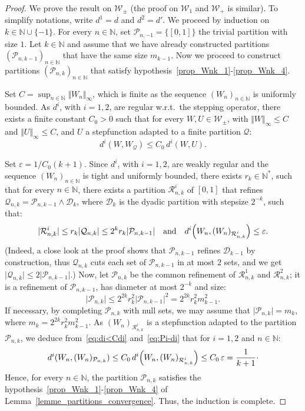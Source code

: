 \documentclass{amsart}
\newcommand{\wrt}{w.r.t.\ }
\theoremstyle{plain}
\theoremstyle{definition}
\newcommand{\signed}{\pm}
\newcommand{\cp}{\mathcal{P}}
\newcommand{\cD}{\mathcal{D}}
\newcommand{\cP}{\mathcal{P}}
\newcommand{\cQ}{\mathcal{Q}}
\newcommand{\cR}{\mathcal{R}}
\newcommand{\Graphon}{\mathcal{W}_1}
\newcommand{\Kernel}{\mathcal{W}_{\signed}}
\newcommand{\Kernelp}{\mathcal{W}_{+}}
\newcommand{\TM}[1]{\norm{#1}_\infty}
\newcommand{\N}{\mathbb{N}}
\newcommand{\norm}[1]{\Vert#1\Vert}
\newcommand{\eps}{\varepsilon}
\begin{document}
\begin{proof}
We prove the result on $\Kernel$ 
(the proof on $\Graphon$ and $\Kernelp$ is similar).
To simplify notations, write $d^1=d$ and $d^2=d'$.
We  proceed  by  induction  on $k\in    \N \cup\{-1\}$.     
For every $n\in\N$, set $\cP_{n,-1} = \{ [0,1] \}$ the trivial partition with size $1$.
  Let  $k\in\N$  and assume 
  that we have already constructed partitions $(\mathcal{P}_{n,k-1} )_{n\in\N}$
  	that have the same size $m_{k-1}$.  
  Now we proceed to  construct partitions $(\mathcal{P}_{n,k})_{n\in\N}$
  that satisfy hypothesis~\ref{prop_Wnk_1}-\ref{prop_Wnk_4}.

Set $C=\sup_{n\in \N} \TM{W_n}$, which is finite as the sequence 
$(W_n)_{n\in \N}$ is uniformly bounded. 
As $d^i$, with $i=1,2$, are  regular       \wrt      the       stepping operator,
there exists a finite constant $C_0>0$ such that for every $W, U\in \Kernel$, 
with $\TM{W}\leq C$ and $\TM{U}\leq C$, and $U$ a stepfunction
adapted to a finite partition  $\mathcal{Q}$:
\begin{equation}
   \label{eq:di<Cdi}
  d^i(W,W_{\mathcal{Q}}) \leq C_0 \, d^i(W,U).
\end{equation}


Set  $\varepsilon=  1/C_0(k+1)$.   Since  $d^i$,  with
$i=1,2$, are  weakly regular and  the sequence $(  W_n )_{n\in\N}$ is  tight and
uniformly  bounded,  there  exists   $r_k\in\N^*$,  such  that  for  every
$n\in \N$,  there exists a
partition  $\cR_{n,k}^i$ of  $[0,1]$  that  refines $\cQ_{n,k} = \cp_{n,k-1} \land \cD_{k}$,
	where $\cD_k$ is the dyadic partition with stepsize $2^{-k}$, 
such that:
\begin{equation}
   \label{eq:Pi-di}
  \vert\cR_{n,k}^i\vert    \leq    r_k   \vert\cQ_{n,k}\vert
  			\leq    2^{k} r_k   \vert\cP_{n,k-1}\vert
  \quad\text{and}\quad
  d^i\Bigl(W_n,   (W_n)_{\cR^i_{n,k}}\Bigr)    \leq    \eps.
\end{equation}
(Indeed, a close look at the proof shows that
	$\cP_{n,k-1}$ refines $\cD_{k-1}$ by construction,
	thus $\cQ_{n,k}$ cuts each set of $\cP_{n,k-1}$ in at most $2$ sets,
	and we get $\vert\cQ_{n,k}\vert \leq 2  \vert\cP_{n,k-1}\vert$.)
Now, let $\mathcal{P}_{n,k}$ be the common refinement of
$\cR_{n,k}^1$  and
$\cR_{n,k}^2$; it is  a refinement of $\mathcal{P}_{n,k-1}$,
has diameter at most $2^{-k}$ and size:
\[
  \vert \mathcal{P}_{n,k} \vert \leq 2^{2k} r_k^2 \vert \cp_{n,k-1} \vert^2
  = 2^{2k} r_k^2 m_{k-1}^2.
\]
If necessary, by completing $\mathcal{P}_{n,k}$ with null sets, we
may assume that $\vert \cP_{n,k} \vert 
	= m_k$, where $m_k = 2^{2k} r_k^2 m_{k-1}^2$.
As $ (W_n)_{\cR^i_{n,k}}$ is a stepfunction 
adapted to the partition $\cp_{n,k}$, we deduce from~\eqref{eq:di<Cdi}
and~\eqref{eq:Pi-di}
that for $i=1,2$ and $n\in \N$:
\[
  d^i(W_n,(W_n)_{\mathcal{P}_{n,k}}) \leq C_0 \, 
  d^i\Bigl(W_n,(W_n)_{\cR_{n,k}^i}\Bigr) 
  \leq  C_0 \, \eps = \frac{1}{k+1}\cdot
\]
Hence, for every $n\in\N$, the partition $\mathcal{P}_{n,k}$
satisfies the   hypothesis~\ref{prop_Wnk_1}-\ref{prop_Wnk_4}         of
Lemma~\ref{lemme_partitions_convergence}. 
Thus,  the induction is complete.
\end{proof}
\end{document}
